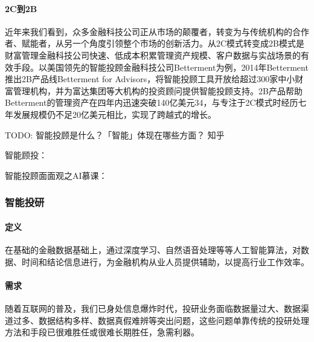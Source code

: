 \documentclass[letterpaper,10pt,english]{sphinxmanual}
\begin{document}
\paragraph{2C到2B}
\label{\detokenize{chapter_AI+Finance/Robo-Advisor:c2b}}
近年来我们看到，众多金融科技公司正从市场的颠覆者，转变为与传统机构的合作者、赋能者，从另一个角度引领整个市场的创新活力。从2C模式转变成2B模式是财富管理金融科技公司快速、低成本积累管理资产规模、客户数据与实战场景的有效手段。以美国领先的智能投顾金融科技公司Betterment为例，2014年Betterment推出2B产品线Betterment
for
Advisors，将智能投顾工具开放给超过300家中小财富管理机构，并为富达集团等大机构的投资顾问提供智能投顾支持。2B产品帮助Betterment的管理资产在四年内迅速突破140亿美元34，与专注于2C模式时经历七年发展规模仍不足20亿美元相比，实现了跨越式的增长。%
\begin{footnote}[1112]\sphinxAtStartFootnote
{}
%
\end{footnote}

TODO: 智能投顾是什么？「智能」体现在哪些方面？ \sphinxhyphen{} 知乎

智能顾投： 

智能投顾面面观之AI慕课： 


\subsubsection{智能投研}
\label{\detokenize{chapter_AI+Finance/AI_Investment_Research:id1}}\label{\detokenize{chapter_AI+Finance/AI_Investment_Research::doc}}

\paragraph{定义}
\label{\detokenize{chapter_AI+Finance/AI_Investment_Research:id2}}
在基础的金融数据基础上，通过深度学习、自然语音处理等等人工智能算法，对数据、时间和结论信息进行，为金融机构从业人员提供辅助，以提高行业工作效率。%
\begin{footnote}[1113]\sphinxAtStartFootnote
{}
%
\end{footnote}


\paragraph{需求}
\label{\detokenize{chapter_AI+Finance/AI_Investment_Research:id3}}
随着互联网的普及，我们已身处信息爆炸时代，投研业务面临数据量过大、数据渠道过多、数据结构多样、数据真假难辨等突出问题，这些问题单靠传统的投研处理方法和手段已很难胜任或很难长期胜任，急需利器。
\end{document}
